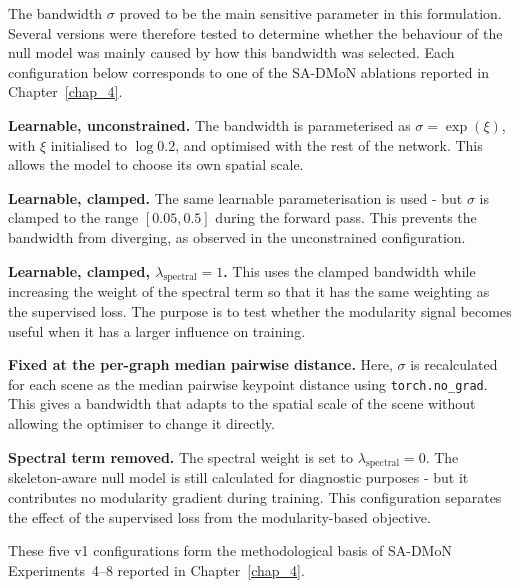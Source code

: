 The bandwidth $\sigma$ proved to be the main sensitive parameter in
this formulation.
Several versions were therefore tested to determine
whether the behaviour of the null model was mainly caused by how this
bandwidth was selected.
Each configuration below corresponds to one of
the SA-DMoN ablations reported in Chapter~\ref{chap_4}.

\begin{compactenum}
    \item \textbf{Learnable, unconstrained.}
        The bandwidth is parameterised as $\sigma=\exp(\xi)$,
        with $\xi$ initialised to $\log 0.2$,
        and optimised with the rest of the network.
        This allows the model to choose its own spatial
        scale.

    \item \textbf{Learnable, clamped.}
        The same learnable parameterisation is used -
        but $\sigma$ is clamped to the range $[0.05,0.5]$
        during the forward pass.
        This prevents the bandwidth from diverging,
        as observed in the unconstrained configuration.

    \item \textbf{Learnable, clamped, $\lambda_{\text{spectral}}=1$.}
        This uses the clamped bandwidth while increasing the weight of
        the spectral term so that it has the same weighting as the
        supervised loss.
        The purpose is to test whether the modularity
        signal becomes useful when it has a larger influence on
        training.

    \item \textbf{Fixed at the per-graph median pairwise distance.}
        Here, $\sigma$ is recalculated for each scene as the median
        pairwise keypoint distance using \texttt{torch.no\_grad}.
        This gives a bandwidth that adapts to the spatial scale
        of the scene without allowing the optimiser to change it directly.

    \item \textbf{Spectral term removed.}
        The spectral weight is set to $\lambda_{\text{spectral}}=0$.
        The skeleton-aware null model is still calculated
        for diagnostic purposes -
        but it contributes no modularity gradient during training.
        This configuration separates the effect of the supervised loss
        from the modularity-based objective.
\end{compactenum}

These five v1 configurations form the methodological basis
of SA-DMoN Experiments~4--8 reported in Chapter~\ref{chap_4}.

